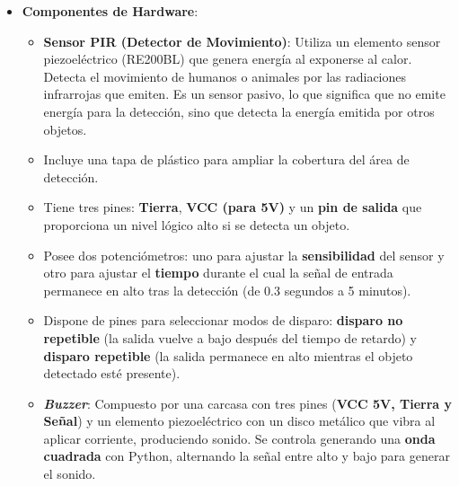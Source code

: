 \documentclass{report}
\begin{document}
\begin{itemize}
    \item \textbf{Componentes de Hardware}:
    \begin{itemize}
        \item \textbf{Sensor PIR (Detector de Movimiento)}: Utiliza un elemento sensor piezoeléctrico (RE200BL) que genera energía al exponerse al calor. 
        Detecta el movimiento de humanos o animales por las radiaciones infrarrojas que emiten. Es un sensor pasivo, lo que significa que no emite energía 
        para la detección, sino que detecta la energía emitida por otros objetos.
        \item Incluye una tapa de plástico para ampliar la cobertura del área de detección.
        \item Tiene tres pines: \textbf{Tierra}, \textbf{VCC (para 5V)} y un \textbf{pin de salida} que proporciona un nivel lógico alto si se detecta un 
        objeto.
        \item Posee dos potenciómetros: uno para ajustar la \textbf{sensibilidad} del sensor y otro para ajustar el \textbf{tiempo} durante el cual la señal 
        de entrada permanece en alto tras la detección (de 0.3 segundos a 5 minutos).
        \item Dispone de pines para seleccionar modos de disparo: \textbf{disparo no repetible} (la salida vuelve a bajo después del tiempo de retardo) y 
        \textbf{disparo repetible} (la salida permanece en alto mientras el objeto detectado esté presente).
        \item \textbf{\textit{Buzzer}}: Compuesto por una carcasa con tres pines (\textbf{VCC 5V, Tierra y Señal}) y un elemento piezoeléctrico con un 
        disco metálico que vibra al aplicar corriente, produciendo sonido. Se controla generando una \textbf{onda cuadrada} con Python, alternando la señal 
        entre alto y bajo para generar el sonido.
    \end{itemize}
    

\end{itemize}
\end{document}
